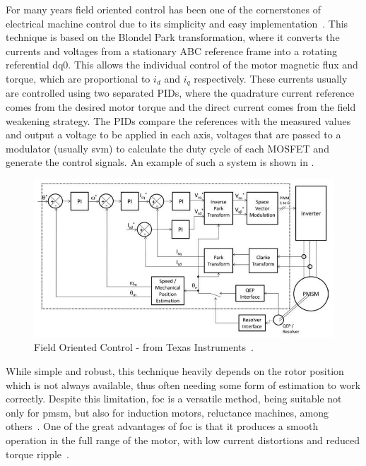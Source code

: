 For many years field oriented control has been one of the cornerstones of electrical machine control due to its simplicity and easy implementation~\cite{Doncker:Universal_FOC:1994}. This technique is based on the Blondel Park transformation, where it converts the currents and voltages from a stationary ABC reference frame into a rotating referential dq0. This allows the individual control of the motor magnetic flux and torque, which are proportional to $i_d$ and $i_q$ respectively. These currents usually are controlled using two separated PIDs, where the quadrature current reference comes from the desired motor torque and the direct current comes from the field weakening strategy. The PIDs compare the references with the measured values and output a voltage to be applied in each axis, voltages that are passed to a modulator (usually \gls{svm}) to calculate the duty cycle of each MOSFET and generate the control signals. An example of such a system is shown in .
\begin{figure}[!htb]
	\centering
	\includegraphics[width=1\textwidth]{Figures/foc_texas_instruments.jpg}
	\caption[Field Oriented Control - from Texas Instruments~\cite{TI:FOC_TMS320F2837:2016}.]{Field Oriented Control - from Texas Instruments~\cite{TI:FOC_TMS320F2837:2016}.}
	\label{fig:example_PID} %
\end{figure}

While simple and robust, this technique heavily depends on the rotor position which is not always available, thus often needing some form of estimation to work correctly. Despite this limitation, \gls{foc} is a versatile method, being suitable not only for \gls{pmsm}, but also for induction motors, reluctance machines, among others~\cite{Hoang:FOC_vs_DTC_induction:1999,Matsuo:FOC_reluctance:1993}. One of the great advantages of \gls{foc} is that it produces a smooth operation in the full range of the motor, with low current distortions and reduced torque ripple~\cite{Adhavan:FOC_fuzzy:2011}.



